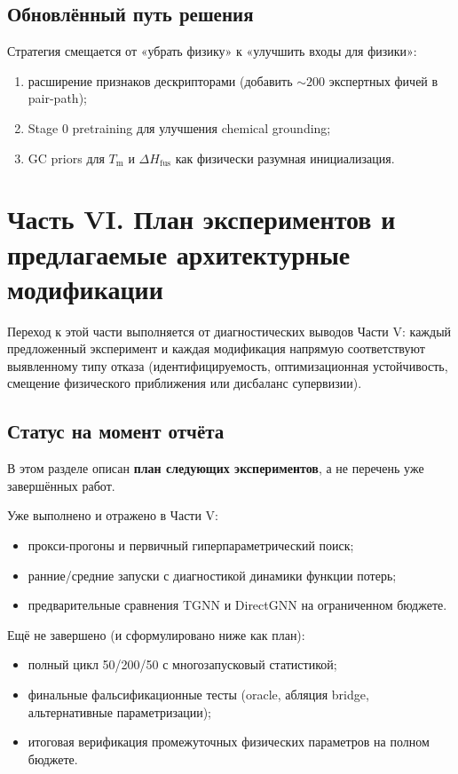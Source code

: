\documentclass[11pt]{article}
\begin{document}
\subsection{Обновлённый путь решения}

Стратегия смещается от «убрать физику» к «улучшить входы для физики»:
\begin{enumerate}
  \item расширение признаков дескрипторами (добавить $\sim200$ экспертных фичей в pair-path);
  \item Stage 0 pretraining для улучшения chemical grounding;
  \item GC priors для $T_{\mathrm{m}}$ и $\Delta H_{\mathrm{fus}}$ как физически разумная инициализация.
\end{enumerate}

\section*{Часть VI. План экспериментов и предлагаемые архитектурные модификации}

Переход к этой части выполняется от диагностических выводов Части V: каждый предложенный эксперимент и каждая модификация напрямую соответствуют выявленному типу отказа (идентифицируемость, оптимизационная устойчивость, смещение физического приближения или дисбаланс супервизии).

\subsection*{Статус на момент отчёта}
В этом разделе описан \textbf{план следующих экспериментов}, а не перечень уже завершённых работ.

Уже выполнено и отражено в Части V:
\begin{itemize}
  \item прокси-прогоны и первичный гиперпараметрический поиск;
  \item ранние/средние запуски с диагностикой динамики функции потерь;
  \item предварительные сравнения TGNN и DirectGNN на ограниченном бюджете.
\end{itemize}

Ещё не завершено (и сформулировано ниже как план):
\begin{itemize}
  \item полный цикл 50/200/50 с многозапусковый статистикой;
  \item финальные фальсификационные тесты (oracle, абляция bridge, альтернативные параметризации);
  \item итоговая верификация промежуточных физических параметров на полном бюджете.
\end{itemize}
\end{document}
